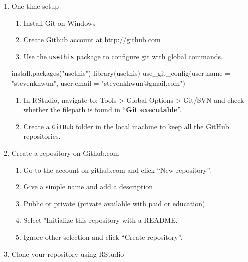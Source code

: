 \documentclass[
]{article}
\newenvironment{Shaded}{\begin{snugshade}}{\end{snugshade}}
\newcommand{\AttributeTok}[1]{\textcolor[rgb]{0.77,0.63,0.00}{#1}}
\newcommand{\FunctionTok}[1]{\textcolor[rgb]{0.00,0.00,0.00}{#1}}
\newcommand{\NormalTok}[1]{#1}
\newcommand{\StringTok}[1]{\textcolor[rgb]{0.31,0.60,0.02}{#1}}
\providecommand{\tightlist}{%
  \setlength{\itemsep}{0pt}\setlength{\parskip}{0pt}}
\begin{document}
\begin{enumerate}
\def\labelenumi{\arabic{enumi}.}
\tightlist
\item
  One time setup

  \begin{enumerate}
  \def\labelenumii{\roman{enumii}.}
  \tightlist
  \item
    Install Git on Windows
  \item
    Create Github account at \url{http://github.com}
  \item
    Use the \texttt{usethis} package to configure git with global
    commands.
  \end{enumerate}

\begin{Shaded}
\begin{Highlighting}[]
\FunctionTok{install.packages}\NormalTok{(}\StringTok{"usethis"}\NormalTok{)}
\FunctionTok{library}\NormalTok{(usethis)}
\FunctionTok{use\_git\_config}\NormalTok{(}\AttributeTok{user.name =} \StringTok{"stevenkhwun"}\NormalTok{, }\AttributeTok{user.email =} \StringTok{"stevenkhwun@gmail.com"}\NormalTok{)}
\end{Highlighting}
\end{Shaded}

  \begin{enumerate}
  \def\labelenumii{\roman{enumii}.}
  \setcounter{enumii}{3}
  \tightlist
  \item
    In RStudio, navigate to: Tools \textgreater{} Global Options
    \textgreater{} Git/SVN and check whether the filepath is found in
    ``\textbf{Git executable}''.
  \item
    Create a \texttt{GitHub} folder in the local machine to keep all the
    GitHub repositories.\\
  \end{enumerate}
\item
  Create a repository on Github.com

  \begin{enumerate}
  \def\labelenumii{\roman{enumii}.}
  \tightlist
  \item
    Go to the account on github.com and click ``New repository''.
  \item
    Give a simple name and add a description
  \item
    Public or private (private available with paid or education)
  \item
    Select "Initialize this repository with a README.
  \item
    Ignore other selection and click ``Create repository''.\\
  \end{enumerate}
\item
  Clone your repository using RStudio


\end{enumerate}
\end{document}
